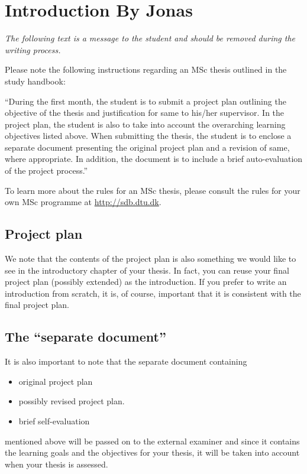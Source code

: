\documentclass[../Thesis.tex]{subfiles}
\begin{document}
\chapter{Introduction By Jonas}

\textit{The following text is a message to the student and should be removed during the writing process.}

Please note the following instructions regarding an MSc thesis outlined in the study handbook:

``During the first month, the student is to submit a project plan outlining the objective of the thesis and justification for same to his/her supervisor. In the project plan, the student is also to take into account the overarching learning objectives listed above. When submitting the thesis, the student is to enclose a separate document presenting the original project plan and a revision of same, where appropriate. In addition, the document is to include a brief auto-evaluation of the project process.''

To learn more about the rules for an MSc thesis, please consult the rules for your own MSc programme at \url{http://sdb.dtu.dk}.

\section{Project plan}
We note that the contents of the project plan is also something we would like to see in the introductory chapter of your thesis. In fact, you can reuse your final project plan (possibly extended) as the introduction. If you prefer to write an introduction from scratch, it is, of course, important that it is consistent with the final project plan.

\section{The ``separate document''}
It is also important to note that the separate document containing
\begin{itemize}
    \item original project plan
    \item possibly revised project plan.
    \item brief self-evaluation
\end{itemize}
mentioned above will be passed on to the external examiner and since it contains the learning goals and the objectives for your thesis, it will be taken into account when your thesis is assessed.

\cite{Hoare78}

\cite{CK01}
\end{document}
